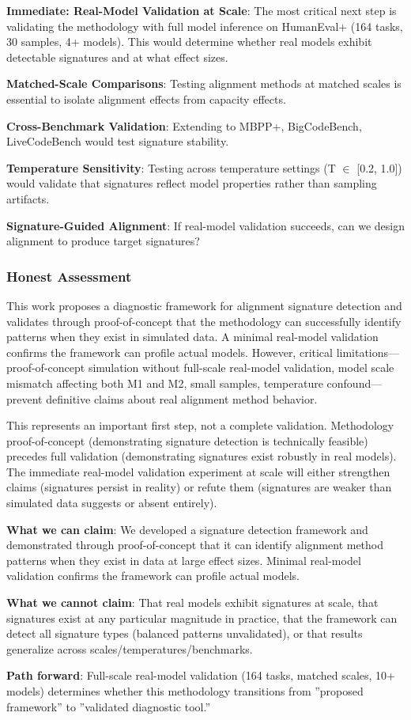 \textbf{Immediate: Real-Model Validation at Scale}: The most critical next step is validating the methodology with full model inference on HumanEval+ (164 tasks, 30 samples, 4+ models). This would determine whether real models exhibit detectable signatures and at what effect sizes.

\textbf{Matched-Scale Comparisons}: Testing alignment methods at matched scales is essential to isolate alignment effects from capacity effects.

\textbf{Cross-Benchmark Validation}: Extending to MBPP+, BigCodeBench, LiveCodeBench would test signature stability.

\textbf{Temperature Sensitivity}: Testing across temperature settings (T $\in$ [0.2, 1.0]) would validate that signatures reflect model properties rather than sampling artifacts.

\textbf{Signature-Guided Alignment}: If real-model validation succeeds, can we design alignment to produce target signatures?

\subsubsection{Honest Assessment}

This work proposes a diagnostic framework for alignment signature detection and validates through proof-of-concept that the methodology can successfully identify patterns when they exist in simulated data. A minimal real-model validation confirms the framework can profile actual models. However, critical limitations---proof-of-concept simulation without full-scale real-model validation, model scale mismatch affecting both M1 and M2, small samples, temperature confound---prevent definitive claims about real alignment method behavior.

This represents an important first step, not a complete validation. Methodology proof-of-concept (demonstrating signature detection is technically feasible) precedes full validation (demonstrating signatures exist robustly in real models). The immediate real-model validation experiment at scale will either strengthen claims (signatures persist in reality) or refute them (signatures are weaker than simulated data suggests or absent entirely).

\textbf{What we can claim}: We developed a signature detection framework and demonstrated through proof-of-concept that it can identify alignment method patterns when they exist in data at large effect sizes. Minimal real-model validation confirms the framework can profile actual models.

\textbf{What we cannot claim}: That real models exhibit signatures at scale, that signatures exist at any particular magnitude in practice, that the framework can detect all signature types (balanced patterns unvalidated), or that results generalize across scales/temperatures/benchmarks.

\textbf{Path forward}: Full-scale real-model validation (164 tasks, matched scales, 10+ models) determines whether this methodology transitions from ''proposed framework'' to ''validated diagnostic tool.''
